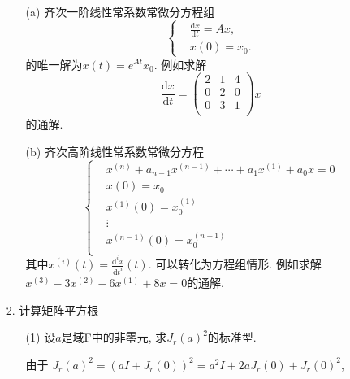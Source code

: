 \begin{itemize}
\begin{itemize}
        \item [(a)]齐次一阶线性常系数常微分方程组
        \begin{equation}
        \nonumber
        \left\{
        \begin{aligned}
        &\frac{\mathrm{d} x}{\mathrm{d} t} = Ax,\\
        &x(0) = x_0.
        \end{aligned}
        \right.
        \end{equation}
        的唯一解为$x(t)=e^{At}x_0$. 例如求解
        \begin{equation}
            \nonumber
            \frac{\mathrm{d} x}{\mathrm{d} t} = 
            \begin{pmatrix}
                2& 1& 4\\
                0& 2& 0\\
                0& 3& 1\\
            \end{pmatrix}
            x
        \end{equation}
        的通解.
        \vspace{3cm}
        \item [(b)]齐次高阶线性常系数常微分方程
        \begin{equation}
        \nonumber
        \left\{
        \begin{aligned}
        &x^{(n)} + a_{n-1} x^{(n-1)} + \cdots + a_1 x^{(1)} + a_0 x = 0\\
        &x(0) = x_0\\
        &x^{(1)}(0) = x_0^{(1)}\\
        &\vdots\\
        &x^{(n-1)}(0) = x_0^{(n-1)}\\
        \end{aligned}
        \right.
        \end{equation}
        其中$x^{(i)}(t) = \frac{\mathrm{d}^i x}{\mathrm{d} t^i}(t).$ 可以转化为方程组情形.
        例如求解$x^{(3)} - 3x^{(2)}-6x^{(1)} + 8x = 0$的通解.
        \vspace{3cm}
    \end{itemize}
    \item [2. ] 计算矩阵平方根
    \begin{itemize}
        \item[(1)] 设$a$是域F中的非零元, 求$J_r(a)^2$的标准型.
        \begin{solution}
            由于
            $J_r(a)^2 = (aI + J_r(0))^2
                      = a^2 I + 2aJ_r(0) + J_r(0)^2$,

\end{solution}
\end{itemize}
\end{itemize}
